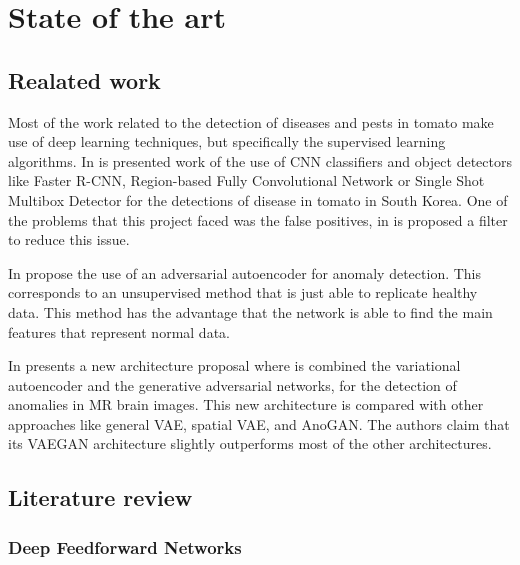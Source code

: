 \chapter{State of the art}
\label{ch:marco}

\section{Realated work}

Most of the work related to the detection of diseases and pests in tomato make use of deep learning techniques, but specifically the supervised learning algorithms. In \cite{Fuentes2017_2} is presented work of the use of CNN classifiers and object detectors like Faster R-CNN, Region-based Fully Convolutional Network or Single Shot Multibox Detector for the detections of disease in tomato in South Korea. One of the problems that this project faced was the false positives,  in \cite{Fuentes2018} is proposed a filter to reduce this issue.

In \cite{AsimeniaDimokranitou2017} propose the use of an adversarial autoencoder for anomaly detection. This corresponds to an unsupervised method that is just able to replicate healthy data. This method has the advantage that the network is able to find the main features that represent normal data.

In \cite{Baur2019} presents a new architecture proposal where is combined the variational autoencoder and the generative adversarial networks, for the detection of anomalies in MR brain images. This new architecture is compared with other approaches like general VAE, spatial VAE, and AnoGAN. The authors claim that its VAEGAN architecture slightly outperforms most of the other architectures.

\section{Literature review}

\subsection{Deep Feedforward Networks}

